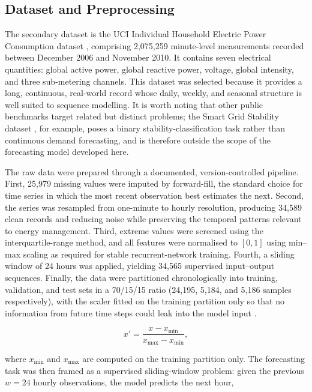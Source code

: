 \documentclass[conference]{IEEEtran}
\begin{document}
\subsection{Dataset and Preprocessing}
The secondary dataset is the UCI Individual Household Electric Power Consumption
dataset \cite{hebrail2012individual}, comprising 2{,}075{,}259 minute-level
measurements recorded between December 2006 and November 2010. It contains seven
electrical quantities: global active power, global reactive power, voltage,
global intensity, and three sub-metering channels. This dataset was selected
because it provides a long, continuous, real-world record whose daily, weekly,
and seasonal structure is well suited to sequence modelling. It is worth noting
that other public benchmarks target related but distinct problems; the Smart
Grid Stability dataset \cite{arzamasov2018towards}, for example, poses a binary
stability-classification task rather than continuous demand forecasting, and is
therefore outside the scope of the forecasting model developed here.
 
The raw data were prepared through a documented, version-controlled pipeline.
First, 25{,}979 missing values were imputed by forward-fill, the standard
choice for time series in which the most recent observation best estimates the
next. Second, the series was resampled from one-minute to hourly resolution,
producing 34{,}589 clean records and reducing noise while preserving the
temporal patterns relevant to energy management. Third, extreme values were
screened using the interquartile-range method, and all features were normalised
to $[0,1]$ using min--max scaling as required for stable recurrent-network
training. Fourth, a sliding window of 24 hours was applied, yielding 34{,}565
supervised input--output sequences. Finally, the data were partitioned
chronologically into training, validation, and test sets in a 70/15/15 ratio
(24{,}195, 5{,}184, and 5{,}186 samples respectively), with the scaler fitted on
the training partition only so that no information from future time steps could
leak into the model input \cite{makridakis2018statistical}.
 
\begin{equation}
x' = \frac{x - x_{\min}}{x_{\max} - x_{\min}}, \label{eq:minmax}
\end{equation}
 
where $x_{\min}$ and $x_{\max}$ are computed on the training partition only. The
forecasting task was then framed as a supervised sliding-window problem: given
the previous $w = 24$ hourly observations, the model predicts the next hour,
 
\end{document}
